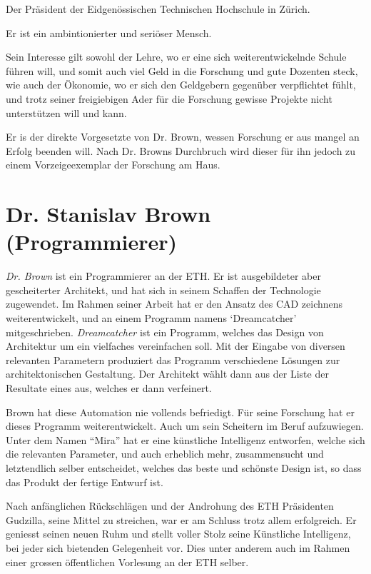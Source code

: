 \documentclass[11pt,a4paper,ngerman]{scrreprt}
\begin{document}
Der Präsident der Eidgenössischen Technischen Hochschule in Zürich.

Er ist ein ambintionierter und seriöser Mensch.

Sein Interesse gilt sowohl der Lehre, wo er eine sich weiterentwickelnde
Schule führen will, und somit auch viel Geld in die Forschung und gute
Dozenten steck, wie auch der Ökonomie, wo er sich den Geldgebern gegenüber
verpflichtet fühlt, und trotz seiner freigiebigen Ader für die Forschung
gewisse Projekte nicht unterstützen will und kann.

Er is der direkte Vorgesetzte von Dr. Brown, wessen Forschung er aus mangel
an Erfolg beenden will. Nach Dr. Browns Durchbruch wird dieser für ihn jedoch
zu einem Vorzeigeexemplar der Forschung am Haus.

\section*{Dr. Stanislav Brown (Programmierer)}

\emph{Dr. Brown} ist ein Programmierer an der ETH. Er ist ausgebildeter aber
gescheiterter Architekt, und hat sich in seinem Schaffen der Technologie
zugewendet. Im Rahmen seiner Arbeit hat er den Ansatz des CAD zeichnens
weiterentwickelt, und an einem Programm namens `Dreamcatcher'
mitgeschrieben. \emph{Dreamcatcher} ist ein Programm, welches das Design von
Architektur um ein vielfaches vereinfachen soll. Mit der Eingabe von diversen
relevanten Parametern produziert das Programm verschiedene Lösungen zur
architektonischen Gestaltung. Der Architekt wählt dann aus der Liste der
Resultate eines aus, welches er dann verfeinert.

Brown hat diese Automation nie vollends befriedigt. Für seine Forschung hat
er dieses Programm weiterentwickelt. Auch um sein Scheitern im Beruf
aufzuwiegen. Unter dem Namen ``Mira'' hat er eine künstliche Intelligenz
entworfen, welche sich die relevanten Parameter, und auch erheblich mehr,
zusammensucht und letztendlich selber entscheidet, welches das beste und
schönste Design ist, so dass das Produkt der fertige Entwurf ist.

Nach anfänglichen Rückschlägen und der Androhung des ETH Präsidenten
Gudzilla, seine Mittel zu streichen, war er am Schluss trotz allem
erfolgreich. Er geniesst seinen neuen Ruhm und stellt voller Stolz seine
Künstliche Intelligenz, bei jeder sich bietenden Gelegenheit vor. Dies unter
anderem auch im Rahmen einer grossen öffentlichen Vorlesung an der ETH
selber.
\end{document}
